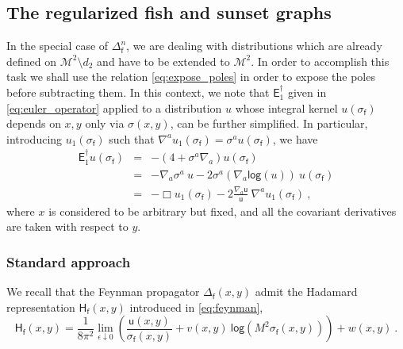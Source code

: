 \documentclass[11pt]{book}
\renewcommand{\log}{\mathsf{log}}
\newcommand{\Mcal}{\mathcal{M}}
\newcommand{\Esf}{\mathsf{E}}
\newcommand{\Hsf}{\mathsf{H}}
\newcommand{\fsf}{\mathsf{f}}
\newcommand{\usf}{\mathsf{u}}
\theoremstyle{break}
\begin{document}
\subsection{The regularized fish and sunset graphs}


In the special case of $\Delta^n_\fsf$, we are dealing with distributions which are already defined on $\Mcal^2\setminus d_2$ and have to be extended to $\Mcal^2$. In order to accomplish this task we shall use the relation \eqref{eq:expose_poles} in order to expose the poles before subtracting them. In this context, we note that $\Esf^\dagger_1$ given in \eqref{eq:euler_operator} applied to a distribution $u$ whose integral kernel $u(\sigma_\fsf)$ depends on $x,y$  only via $\sigma(x,y)$, can be further simplified. In particular, introducing $u_1(\sigma_\fsf)$ such that $\nabla^a u_1(\sigma_\fsf) = \sigma^a u(\sigma_\fsf)$, we have
%
\begin{eqnarray}
\Esf_1^\dagger u(\sigma_\fsf) &=& -\left( 4 + \sigma^a\nabla_a \right) u(\sigma_\fsf) \nonumber \\
&=& - \nabla_a \sigma^a \ u - 2 \sigma^a (\nabla_a \log (u)) \ u(\sigma_\fsf) \nonumber \\ 
&=& - \Box u_1(\sigma_\fsf) - 2 \frac{\nabla_a \usf}{\usf} \ \nabla^a u_1(\sigma_\fsf) \ , 
\label{eq:E_simplified}
\end{eqnarray}
%
where $x$ is considered to be arbitrary but fixed, and all the covariant derivatives are taken with respect to $y$.


\subsubsection{Standard approach}


We recall that the Feynman propagator $\Delta_\fsf(x,y)$ admit the Hadamard representation $\Hsf_\fsf(x,y)$ introduced in \eqref{eq:feynman},
%
\begin{equation*}
\Hsf_\fsf(x,y) = \frac{1}{8\pi^2}  \lim_{\epsilon \downarrow 0} \left( \frac{\usf(x,y)}{\sigma_\fsf(x,y)} + v(x,y) \ \log\left( M^2 \sigma_\fsf(x,y)\right) \right) + w(x,y) \ .
\end{equation*}
\end{document}
